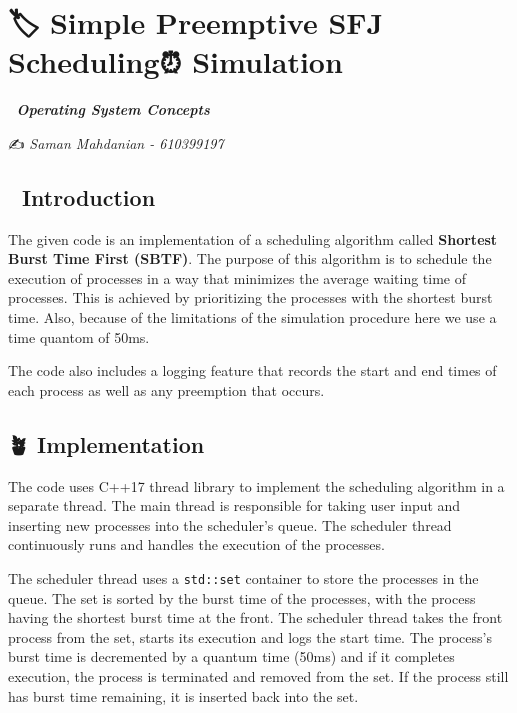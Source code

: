 \hypertarget{simple-preemptive-sfj-scheduling-simulation}{%
\section{🏷️ Simple Preemptive SFJ Scheduling⏰
Simulation🧪}\label{simple-preemptive-sfj-scheduling-simulation}}

📖 \textbf{\emph{Operating System Concepts}}

✍️ \emph{Saman Mahdanian - 610399197}

\hypertarget{introduction}{%
\subsection{🌱 Introduction}\label{introduction}}

The given code is an implementation of a scheduling algorithm called
\textbf{Shortest Burst Time First (SBTF)}. The purpose of this algorithm
is to schedule the execution of processes in a way that minimizes the
average waiting time of processes. This is achieved by prioritizing the
processes with the shortest burst time. Also, because of the limitations
of the simulation procedure here we use a time quantom of 50ms.

The code also includes a logging feature that records the start and end
times of each process as well as any preemption that occurs.

\hypertarget{implementation}{%
\subsection{🪴 Implementation}\label{implementation}}

The code uses C++17 thread library to implement the scheduling algorithm
in a separate thread. The main thread is responsible for taking user
input and inserting new processes into the scheduler's queue. The
scheduler thread continuously runs and handles the execution of the
processes.

The scheduler thread uses a \texttt{std::set} container to store the
processes in the queue. The set is sorted by the burst time of the
processes, with the process having the shortest burst time at the front.
The scheduler thread takes the front process from the set, starts its
execution and logs the start time. The process's burst time is
decremented by a quantum time (50ms) and if it completes execution, the
process is terminated and removed from the set. If the process still has
burst time remaining, it is inserted back into the set.

